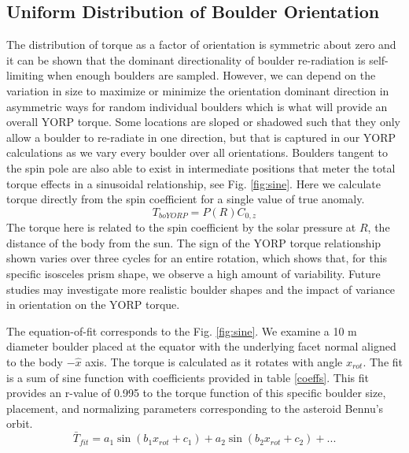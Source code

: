 \subsection{Uniform Distribution of Boulder Orientation}

The distribution of torque as a factor of orientation is symmetric about zero and it can be shown that the dominant directionality of boulder re-radiation is self-limiting when enough boulders are sampled. However, we can depend on the variation in size to maximize or minimize the orientation dominant direction in asymmetric ways for random individual boulders which is what will provide an overall YORP torque. Some locations are sloped or shadowed such that they only allow a boulder to re-radiate in one direction, but that is captured in our YORP calculations as we vary every boulder over all orientations. Boulders tangent to the spin pole are also able to exist in intermediate positions that meter the total torque effects in a sinusoidal relationship, see Fig. \ref{fig:sine}. Here we calculate torque directly from the spin coefficient for a single value of true anomaly. 
\begin{equation}
    T_{boYORP} = P(R) C_{0,z}
\end{equation}
The torque here is related to the spin coefficient by the solar pressure at $R$, the distance of the body from the sun. The sign of the YORP torque relationship shown varies over three cycles for an entire rotation, which shows that, for this specific isosceles prism shape, we observe a high amount of variability. Future studies may investigate more realistic boulder shapes and the impact of variance in orientation on the YORP torque. 

The equation-of-fit corresponds to the Fig. \ref{fig:sine}. We examine a 10 m diameter boulder placed at the equator with the underlying facet normal aligned to the body $-\hat{x}$ axis. The torque is calculated as it rotates with angle $x_{rot}$. The fit is a sum of sine function with coefficients provided in table \ref{coeffs}. This fit provides an r-value of 0.995 to the torque function of this specific boulder size, placement, and normalizing parameters corresponding to the asteroid Bennu's orbit.
\begin{equation}
    \bar{T}_{fit} = a_1\sin(b_1 x_{rot} + c_1) + a_2\sin(b_2 x_{rot} + c_2) + ... 
\end{equation}

